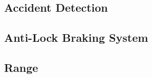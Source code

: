 \documentclass{beamer}
\begin{document}
\subsection{Accident Detection}
\begin{frame}
\end{frame}
\subsection{Anti-Lock Braking System}
\begin{frame}
\end{frame}
\subsection{Range}
\begin{frame}
\end{frame}
\end{document}
